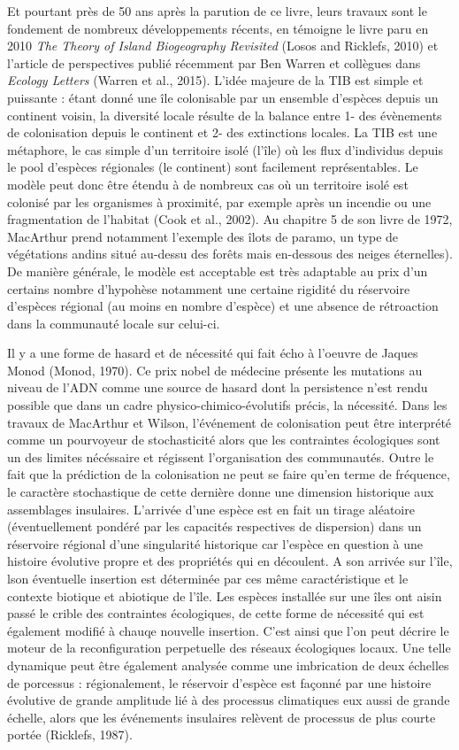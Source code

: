 Et pourtant près de 50 ans après la parution de ce livre, leurs travaux
sont le fondement de nombreux développements récents, en témoigne le
livre paru en 2010 \emph{The Theory of Island Biogeography Revisited}
(Losos and Ricklefs, 2010) et l'article de perspectives publié récemment
par Ben Warren et collègues dans \emph{Ecology Letters} (Warren et al.,
2015). L'idée majeure de la TIB est simple et puissante : étant donné
une île colonisable par un ensemble d'espèces depuis un continent
voisin, la diversité locale résulte de la balance entre 1- des
évènements de colonisation depuis le continent et 2- des extinctions
locales. La TIB est une métaphore, le cas simple d'un territoire isolé
(l'île) où les flux d'individus depuis le pool d'espèces régionales (le
continent) sont facilement représentables. Le modèle peut donc être
étendu à de nombreux cas où un territoire isolé est colonisé par les
organismes à proximité, par exemple après un incendie ou une
fragmentation de l'habitat (Cook et al., 2002). Au chapitre 5 de son
livre de 1972, MacArthur prend notamment l'exemple des îlots de paramo,
un type de végétations andins situé au-dessu des forêts mais en-dessous
des neiges éternelles). De manière générale, le modèle est acceptable
est très adaptable au prix d'un certains nombre d'hypohèse notamment une
certaine rigidité du réservoire d'espèces régional (au moins en nombre
d'espèce) et une absence de rétroaction dans la communauté locale sur
celui-ci.

Il y a une forme de hasard et de nécessité qui fait écho à l'oeuvre de
Jaques Monod (Monod, 1970). Ce prix nobel de médecine présente les
mutations au niveau de l'ADN comme une source de hasard dont la
persistence n'est rendu possible que dans un cadre
physico-chimico-évolutifs précis, la nécessité. Dans les travaux de
MacArthur et Wilson, l'événement de colonisation peut être interprété
comme un pourvoyeur de stochasticité alors que les contraintes
écologiques sont un des limites nécéssaire et régissent l'organisation
des communautés. Outre le fait que la prédiction de la colonisation ne
peut se faire qu'en terme de fréquence, le caractère stochastique de
cette dernière donne une dimension historique aux assemblages
insulaires. L'arrivée d'une espèce est en fait un tirage aléatoire
(éventuellement pondéré par les capacités respectives de dispersion)
dans un réservoire régional d'une singularité historique car l'espèce en
question à une histoire évolutive propre et des propriétés qui en
découlent. A son arrivée sur l'île, lson éventuelle insertion est
déterminée par ces même caractéristique et le contexte biotique et
abiotique de l'île. Les espèces installée sur une îles ont aisin passé
le crible des contraintes écologiques, de cette forme de nécessité qui
est également modifié à chauqe nouvelle insertion. C'est ainsi que l'on
peut décrire le moteur de la reconfiguration perpetuelle des réseaux
écologiques locaux. Une telle dynamique peut être également analysée
comme une imbrication de deux échelles de porcessus : régionalement, le
réservoir d'espèce est façonné par une histoire évolutive de grande
amplitude lié à des processus climatiques eux aussi de grande échelle,
alors que les événements insulaires relèvent de processus de plus courte
portée (Ricklefs, 1987).

